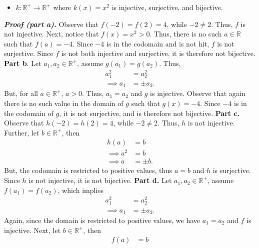 \documentclass{report}
\begin{document}
\begin{itemize}
\begin{itemize}
                \item \( k : \mathbb{R}^+ \to \mathbb{R}^+ \) where \( k(x) = x^2 \) is injective, surjective, and bijective.
            \end{itemize}
            \bigbreak \noindent 
            \textbf{\textit{Proof (part a).}} Observe that $f(-2) = f(2) =4 $, while $-2 \ne 2 $. Thus, $f$ is not injective. Next, notice that $f(x) = x^{2} > 0$. Thus, there is no such $a\in \mathbb{R}$ such that $f(a) = -4$. Since $-4$ is in the codomain and is not hit, $f$ is not surjective. Since $f$ is not both injective and surjective, it is therefore not bijective. 
            \bigbreak \noindent 
            \textbf{Part b}. Let $a_{1}, a_{2} \in \mathbb{R}^{+}$, assume $g(a_{1}) = g(a_{2})$. Thus,
            \begin{align*}
                a_{1}^{2} &= a_{2}^{2} \\
                \implies a_{1} &= \pm a_{2}
            .\end{align*}
            But, for all $a\in \mathbb{R}^{+}$, $a >0$. Thus, $a_{1} = a_{2}$ and $g $ is injective. Observe that again there is no such value in the domain of $g$ such that $g(x) = -4$. Since $-4$ is in the codomain of $g$, it is not surjective, and is therefore not bijective.
            \bigbreak \noindent 
            \textbf{Part c.} Observe that $h(-2) = h(2) = 4$, while $-2 \ne 2$. Thus, $ h$ is not injective. Further, let $b\in \mathbb{R}^{+}$, then
            \begin{align*}
                h(a) &= b \\
                \implies a^{2} &= b \\
                \implies a &= \pm b
            .\end{align*}
            But, the codomain is restricted to positive values, thus $a=b$ and $h $ is surjective. Since $h$ is not injective, it is not bijective.
            \bigbreak \noindent 
            \textbf{Part d.} Let $a_{1}, a_{2} \in \mathbb{R}^{+}$, assume $f(a_{1}) = f(a_{2}) $, which implies
            \begin{align*}
                a_{1}^{2} &= a_{2}^{2} \\
                \implies a_{1} &= \pm a_{2}
            .\end{align*}
            Again, since the domain is restricted to positive values, we have $a_{1} = a_{2}$ and $f$ is injective. Next, let $b\in \mathbb{R}^{+}$, then
            \begin{align*}
                f(a) &= b \\

\end{align*}
\end{itemize}
\end{document}
